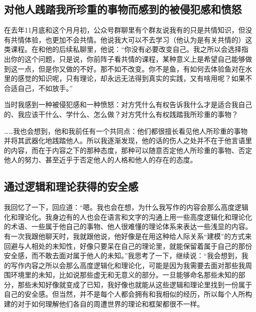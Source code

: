 

\subsection*{对他人践踏我所珍重的事物而感到的被侵犯感和愤怒}

在去年11月底和这个月月初，公众号群聊里有个群友说我有的只是共情知识，但没有共情体验，也更加不会共情。他说我大可以不去学习（他认为是有关共情的）这类课程。在和他的后续私聊里，他说：“你没有必要改变自己。我之所以会选择指出你的这个问题，只是说，你前阵子看共情的课程，某种意义上是希望自己能够做到这一点，但是你又做的不好。那不如不改变。你不是鱼，有如何去体验鱼对在水里的感觉的知识呢，只有理论，却永远无法得到真实的实践，又有啥用呢？如果不合适自己，不如放手。”

当时我感到一种被侵犯感和一种愤怒：对方凭什么有权告诉我什么才是适合我自己的、我应该干什么、学什么、怎么做？对方凭什么有权践踏我所珍重的事物？

……我也会想到，他和我前任有一个共同点：他们都很擅长看见他人所珍重的事物并将其武器化地践踏他人。所以我逐渐发现，他的话的伤人之处并不在于他言语里的内容，而在于内容之下的那种态度，那种可以随意否定他人所珍重的事物、否定他人的努力、甚至近乎于否定他人的人格和他人的存在的态度。



\subsection*{通过逻辑和理论获得的安全感}

我回忆了一下，回应道：“嗯。我也会在想，为什么我写作的内容会那么高度逻辑化和理论化。我身边有的人也会在语言和文字的沟通上用一些高度逻辑化和理论化的术语、一些属于他自己的事物、他人很难懂的理论体系来表达一些浅显的内容。有一次我跟他聊天时，我就跟他说，他好像是在用这种给人际关系“建模”的方式来回避与人相处的未知性，好像只要呆在自己的理论里，就能保留着属于自己的那份安全感，而不敢去面对属于他人的未知。”我思考了一下，继续说：“我会想到，我的写作内容之所以会那么高度逻辑化和理论化，可能是因为我需要去面对那些我周围环境里的未知，比如说那些虚无和无意义的部分。一旦能够命名那些未知的部分，那些未知好像就变成了已知，我好像也就能从这些逻辑和理论里找到一份属于自己的安全感。但当然，并不是每个人都会拥有和我相似的经历，所以每个人所构建的对于如何理解他们各自的周遭世界的理论和框架都很不一样。



